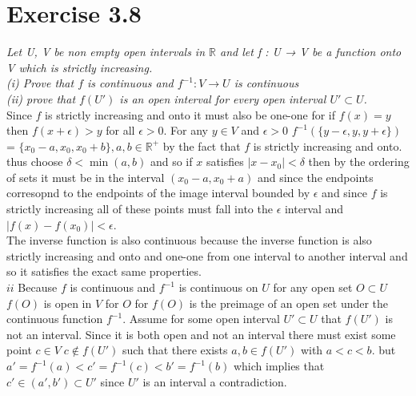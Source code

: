 \documentclass{amsart}
\begin{document}
    \section{Exercise 3.8}
    \emph{Let U, V be non empty open intervals in $ \mathbb{R} $ and let f : U → V be a
    function onto V which is strictly increasing.\\
    (i) Prove that $f$ is continuous and $f^{-1}: V \rightarrow U$ is continuous\\
    (ii) prove that $f(U')$ is an open interval for every open interval $U' \subset U$.}\\
    Since $f$ is strictly increasing and onto it must also be one-one for if $f(x) = y$ then  $f(x+\epsilon ) > y$ for all $\epsilon > 0$.
    For any $y \in V$ and $\epsilon > 0$ $f^{-1}(\{y-\epsilon, y, y+\epsilon \})$= $\{x_0-a, x_0, x_0+b\}, a,b \in \mathbb{R}^{+}$ by the fact that $f$ is strictly increasing and onto.
    thus choose $\delta < \min({a,b})$ and so if $x$ satisfies  $|x-x_0| < \delta  $ then by the ordering of sets it must be in the interval $(x_0-a,x_0+a)$ and since the endpoints corresopnd to the endpoints of the image interval bounded by $\epsilon $ and since $f$ is strictly increasing
    all of these points must fall into the $\epsilon $ interval and $|f(x) - f(x_0)| <  \epsilon $.\\
    The inverse function is also continuous because the inverse function is also strictly increasing and onto and one-one from one interval to another interval and so it satisfies the exact same properties.
    \\
    $ii$ Because $f$ is continuous and $f^{-1}$ is continuous on $U$ for any open set $O \subset U$ $f(O)$ is open in $V$ for $O$ for $f(O)$ is the preimage of an open set under the continuous function $f^{-1}$.
    Assume for some open interval $U' \subset U$ that $f(U')$  is not an interval. Since it is both open and not an interval there must exist some point $c \in V \; c \not\in f(U')$ such that there exists $a,b \in f(U')$ with $a < c < b$. but $a' = f^{-1}(a) < c' = f^{-1}(c) < b' = f^{-1}(b)$ which implies that $c' \in (a',b') \subset U'$ since $U'$ is an interval a contradiction.
\end{document}
